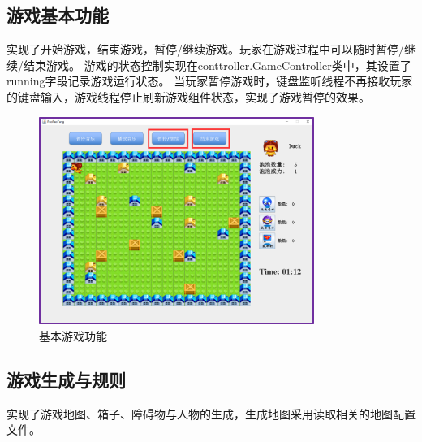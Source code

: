 \documentclass[UTF8, a4paper]{ctexart}
\begin{document}
\subsection{游戏基本功能}
实现了开始游戏，结束游戏，暂停/继续游戏。玩家在游戏过程中可以随时暂停/继续/结束游戏。
游戏的状态控制实现在conttroller.GameController类中，其设置了running字段记录游戏运行状态。
当玩家暂停游戏时，键盘监听线程不再接收玩家的键盘输入，游戏线程停止刷新游戏组件状态，实现了游戏暂停的效果。
  \begin{figure}[H] %
    \centering
    \includegraphics[width=0.80\textwidth]{control.png}
    \caption{基本游戏功能}
    \label{fig:basic}
  \end{figure}
\subsection{游戏生成与规则}
实现了游戏地图、箱子、障碍物与人物的生成，生成地图采用读取相关的地图配置文件。
\end{document}
